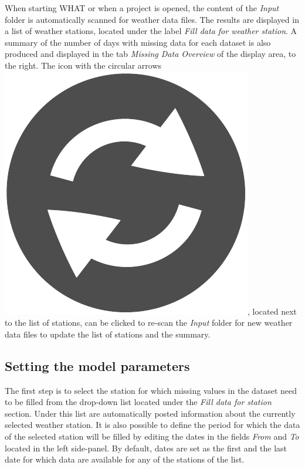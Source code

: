 \documentclass[WHATMANUAL.tex]{subfiles}
\begin{document}
When starting WHAT or when a project is opened, the content of the \emph{Input} folder is automatically scanned for weather data files. The results are displayed in a list of weather stations, located under the label \emph{Fill data for weather station}. A summary of the number of days with missing data for each dataset is also produced and displayed in the tab \emph{Missing Data Overview} of the display area, to the right. The icon with the circular arrows~{\includegraphics[height=2ex]{img/refresh2}}, located next to the list of stations, can be clicked to re-scan the \emph{Input} folder for new weather data files to update the list of stations and the summary. 

\begin{figure}[!ht]
    \setlength{\fboxsep}{0pt}
    {
    }
\end{figure}

\subsection{Setting the model parameters}

The first step is to select the station for which missing values in the dataset need to be filled from the drop-down list located under the \emph{Fill data for station} section. Under this list are automatically posted information about the currently selected weather station. It is also possible to define the period for which the data of the selected station will be filled by editing the dates in the fields \emph{From} and \emph{To} located in the left side-panel. By default, dates are set as the first and the last date for which data are available for any of the stations of the list.
\end{document}
